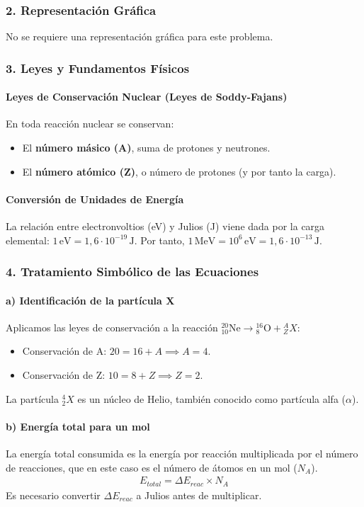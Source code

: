 \subsubsection*{2. Representación Gráfica}
No se requiere una representación gráfica para este problema.

\subsubsection*{3. Leyes y Fundamentos Físicos}
\paragraph*{Leyes de Conservación Nuclear (Leyes de Soddy-Fajans)}
En toda reacción nuclear se conservan:
\begin{itemize}
    \item El \textbf{número másico (A)}, suma de protones y neutrones.
    \item El \textbf{número atómico (Z)}, o número de protones (y por tanto la carga).
\end{itemize}
\paragraph*{Conversión de Unidades de Energía}
La relación entre electronvoltios (eV) y Julios (J) viene dada por la carga elemental: $1\,\text{eV} = 1,6\cdot10^{-19}\,\text{J}$. Por tanto, $1\,\text{MeV} = 10^6\,\text{eV} = 1,6\cdot10^{-13}\,\text{J}$.

\subsubsection*{4. Tratamiento Simbólico de las Ecuaciones}
\paragraph*{a) Identificación de la partícula X}
Aplicamos las leyes de conservación a la reacción ${}_{10}^{20}\text{Ne} \to {}_{8}^{16}\text{O} + {}_{Z}^{A}X$:
\begin{itemize}
    \item Conservación de A: $20 = 16 + A \implies A = 4$.
    \item Conservación de Z: $10 = 8 + Z \implies Z = 2$.
\end{itemize}
La partícula ${}_{2}^{4}X$ es un núcleo de Helio, también conocido como partícula alfa ($\alpha$).

\paragraph*{b) Energía total para un mol}
La energía total consumida es la energía por reacción multiplicada por el número de reacciones, que en este caso es el número de átomos en un mol ($N_A$).
\begin{gather}
    E_{total} = \Delta E_{reac} \times N_A
\end{gather}
Es necesario convertir $\Delta E_{reac}$ a Julios antes de multiplicar.

